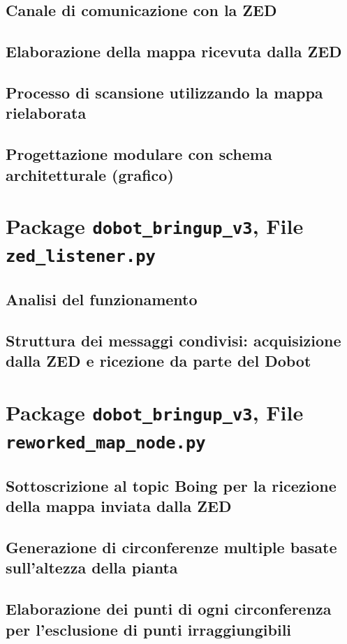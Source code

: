 \documentclass[12pt,a4paper,twoside,openright]{book}
\begin{document}
	\subsection{Canale di comunicazione con la ZED}
	\subsection{Elaborazione della mappa ricevuta dalla ZED}
	\subsection{Processo di scansione utilizzando la mappa rielaborata}
	\subsection{Progettazione modulare con schema architetturale (grafico)}
	
	\section{Package \texttt{dobot\_bringup\_v3}, File \texttt{zed\_listener.py}}
	\subsection{Analisi del funzionamento}
	\subsection{Struttura dei messaggi condivisi: acquisizione dalla ZED e ricezione da parte del Dobot}
	
	\section{Package \texttt{dobot\_bringup\_v3}, File \texttt{reworked\_map\_node.py}}
	\subsection{Sottoscrizione al topic Boing per la ricezione della mappa inviata dalla ZED}
	\subsection{Generazione di circonferenze multiple basate sull'altezza della pianta}
	\subsection{Elaborazione dei punti di ogni circonferenza per l'esclusione di punti irraggiungibili}
\end{document}
